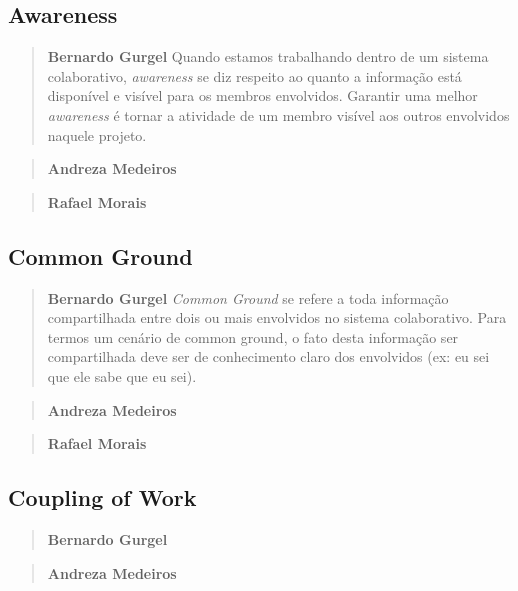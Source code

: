 \documentclass{acm_proc_article-sp}
\begin{document}
\subsection{Awareness}

\begin{quote}\textbf{Bernardo Gurgel}
Quando estamos trabalhando dentro de um sistema colaborativo, \textsl{awareness} se diz respeito ao quanto a informação está disponível e visível para os membros envolvidos. Garantir uma melhor \textsl{awareness} é tornar a atividade de um membro visível aos outros envolvidos naquele projeto.
\end{quote}

\begin{quote}\textbf{Andreza Medeiros}
\end{quote}

\begin{quote}\textbf{Rafael Morais}
\end{quote}

\subsection{Common Ground}

\begin{quote}\textbf{Bernardo Gurgel}
\textsl{Common Ground} se refere a toda informação compartilhada entre dois ou mais envolvidos no sistema colaborativo. Para termos um cenário de common ground, o fato desta informação ser compartilhada deve ser de conhecimento claro dos envolvidos (ex: eu sei que ele sabe que eu sei).
\end{quote}

\begin{quote}\textbf{Andreza Medeiros}
\end{quote}

\begin{quote}\textbf{Rafael Morais}
\end{quote}

\subsection{Coupling of Work}

\begin{quote}\textbf{Bernardo Gurgel}
\end{quote}

\begin{quote}\textbf{Andreza Medeiros}
\end{quote}
\end{document}
